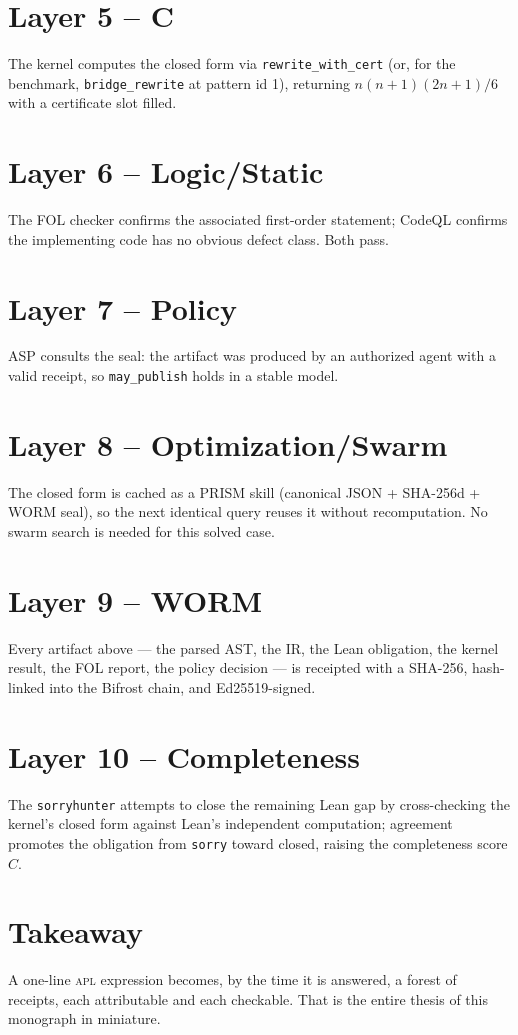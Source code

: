 \section{Layer 5 -- C{\textendash}{\textendash}}
\label{sec:case-l5}

The kernel computes the closed form via \texttt{rewrite\_with\_cert} (or, for
the benchmark, \texttt{bridge\_rewrite} at pattern id 1), returning
$n(n+1)(2n+1)/6$ with a certificate slot filled.

\section{Layer 6 -- Logic/Static}
\label{sec:case-l6}

The FOL checker confirms the associated first-order statement; CodeQL confirms
the implementing code has no obvious defect class. Both pass.

\section{Layer 7 -- Policy}
\label{sec:case-l7}

ASP consults the seal: the artifact was produced by an authorized agent with a
valid receipt, so \texttt{may\_publish} holds in a stable model.

\section{Layer 8 -- Optimization/Swarm}
\label{sec:case-l8}

The closed form is cached as a PRISM skill (canonical JSON + SHA-256d + WORM
seal), so the next identical query reuses it without recomputation. No swarm
search is needed for this solved case.

\section{Layer 9 -- WORM}
\label{sec:case-l9}

Every artifact above --- the parsed AST, the IR, the Lean obligation, the
kernel result, the FOL report, the policy decision --- is receipted with a
SHA-256, hash-linked into the Bifrost chain, and Ed25519-signed.

\section{Layer 10 -- Completeness}
\label{sec:case-l10}

The \texttt{sorryhunter} attempts to close the remaining Lean gap by
cross-checking the kernel's closed form against Lean's independent
computation; agreement promotes the obligation from \texttt{sorry} toward
closed, raising the completeness score $C$.

\section{Takeaway}
\label{sec:case-take}

A one-line \textsc{apl} expression becomes, by the time it is answered, a
forest of receipts, each attributable and each checkable. That is the entire
thesis of this monograph in miniature.

